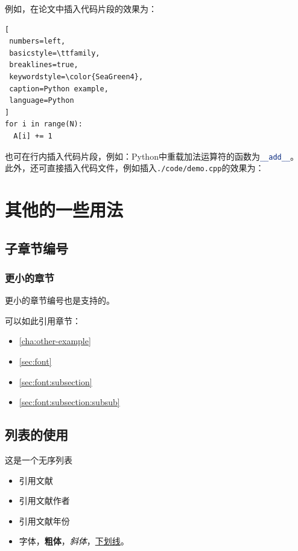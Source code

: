 例如，在论文中插入代码片段的效果为：

\begin{lstlisting}[
 numbers=left,
 basicstyle=\ttfamily,
 breaklines=true,
 keywordstyle=\color{SeaGreen4},
 caption=Python example,
 language=Python
]
for i in range(N):
  A[i] += 1
\end{lstlisting}

也可在行内插入代码片段，例如：Python中重载加法运算符的函数为\lstinline[language=Python,keywordstyle=\color{SeaGreen4}]{__add__}。
此外，还可直接插入代码文件，例如插入\texttt{./code/demo.cpp}的效果为：




\section{其他的一些用法}
\label{sec:font}
\subsection{子章节编号}
\label{sec:font:subsection}
\subsubsection{更小的章节}
\label{sec:font:subsection:subsub}
更小的章节编号也是支持的。

可以如此引用章节：

\begin{itemize}
    \item \autoref{cha:other-example}
    \item  \autoref{sec:font}
    \item  \autoref{sec:font:subsection}
    \item  \autoref{sec:font:subsection:subsub}
\end{itemize}


\subsection{列表的使用}
\label{sec:font:list}

这是一个无序列表
\begin{itemize}
    \item 引用文献\cite{long2015fully}
    \item 引用文献作者\citeauthor{long2015fully}
    \item 引用文献年份\citeyear{long2015fully} 
    \item 字体{\color{red}{变红}}，\textbf{粗体}，\textit{斜体}，\underline{下划线}。
\end{itemize}

